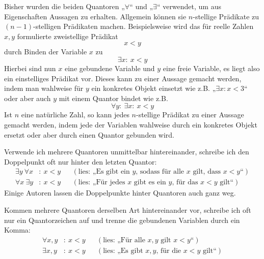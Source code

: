 \begin{bem}
    Bisher wurden die beiden Quantoren „$\forall$“ und „$\exists$“ verwendet, um aus Eigenschaften Aussagen zu erhalten. Allgemein können sie $n$-stellige Prädikate zu $(n-1)$-stelligen Prädikaten machen. Beispielsweise wird das für reelle Zahlen $x,y$ formulierte zweistellige Prädikat
        \[ x < y \]
    durch Binden der Variable $x$ zu
        \[ \exists x:\ x<y \]
    Hierbei sind nun $x$ eine gebundene Variable und $y$ eine freie Variable, es liegt also ein einstelliges Prädikat vor. Dieses kann zu einer Aussage gemacht werden, indem man wahlweise für $y$ ein konkretes Objekt einsetzt wie z.B. „$\exists x: x < 3$“ oder aber auch $y$ mit einem Quantor bindet wie z.B.
        \[ \forall y:\ \exists x:\ x < y \]
    Ist $n$ eine natürliche Zahl, so kann jedes $n$-stellige Prädikat zu einer Aussage gemacht werden, indem jede der Variablen wahlweise durch ein konkretes Objekt ersetzt oder aber durch einen Quantor gebunden wird.
\end{bem}
 
 
\begin{nota}
    Verwende ich mehrere Quantoren unmittelbar hintereinander, schreibe ich den Doppelpunkt oft nur hinter den letzten Quantor:
    \begin{align*}
        \exists y\ \forall x& :\ x < y && (\text{lies: „Es gibt ein $y$, sodass für alle $x$ gilt, dass $x<y$“}) \\
        \forall x\ \exists y& :\ x < y && (\text{lies: „Für jedes $x$ gibt es ein $y$, für das $x<y$ gilt“})  
    \end{align*}
    Einige Autoren lassen die Doppelpunkte hinter Quantoren auch ganz weg.
    
    Kommen mehrere Quantoren derselben Art hintereinander vor, schreibe ich oft nur ein Quantorzeichen auf und trenne die gebundenen Variablen durch ein Komma:
    \begin{align*}
        \forall x,y&:\ x<y && (\text{lies: „Für alle $x,y$ gilt $x<y$“}) \\
        \exists x,y&:\ x<y && (\text{lies: „Es gibt $x,y$, für die $x<y$ gilt“}) 
    \end{align*}
\end{nota}

